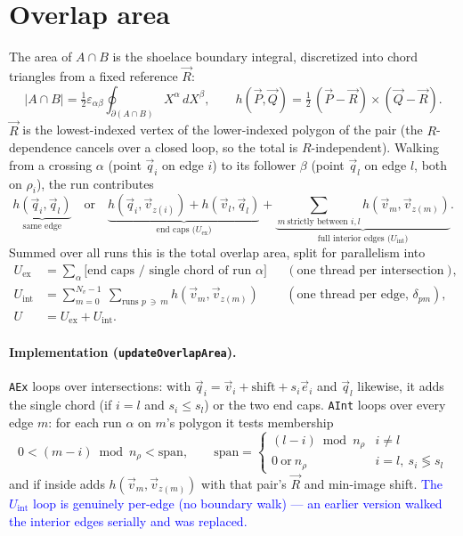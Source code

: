 \documentclass[11pt]{article}
\newcommand{\vv}[1]{\vec{#1}}
\newcommand{\eps}{\varepsilon}
\newcommand{\half}{\tfrac{1}{2}}
\newcommand{\cross}[2]{#1\!\times\!#2}
\newcommand{\code}[1]{\texttt{#1}}
\newcommand{\note}[1]{\textcolor{blue}{#1}}
\begin{document}
\section{Overlap area}

The area of $A\cap B$ is the shoelace boundary integral, discretized into chord triangles from a
fixed reference $\vv R$:
\begin{equation}
  |A\cap B|=\half\eps_{\alpha\beta}\oint_{\partial(A\cap B)}X^\alpha\,dX^\beta,\qquad
  h(\vv P,\vv Q)=\half\,\cross{(\vv P-\vv R)}{(\vv Q-\vv R)} .
\end{equation}
$\vv R$ is the lowest-indexed vertex of the lower-indexed polygon of the pair (the $R$-dependence
cancels over a closed loop, so the total is $R$-independent). Walking from a crossing $\alpha$ (point
$\vv q_i$ on edge $i$) to its follower $\beta$ (point $\vv q_l$ on edge $l$, both on $\rho_i$), the
run contributes
\begin{equation}
  \underbrace{h(\vv q_i,\vv q_l)}_{\text{same edge}}
  \quad\text{or}\quad
  \underbrace{h(\vv q_i,\vv v_{z(i)})+h(\vv v_l,\vv q_l)}_{\text{end caps (}U_{\text{ex}})}
  +\underbrace{\sum_{m\ \text{strictly between }i,l}h(\vv v_m,\vv v_{z(m)})}_{\text{full interior edges (}U_{\text{int}})}.
\end{equation}
Summed over all runs this is the total overlap area, split for parallelism into
\begin{align}
  U_{\text{ex}} &=\sum_{\alpha}\big[\text{end caps / single chord of run }\alpha\big]
    &&(\text{one thread per intersection}),\\
  U_{\text{int}}&=\sum_{m=0}^{N_v-1}\ \sum_{\text{runs }p\ \ni\ m}h(\vv v_m,\vv v_{z(m)})
    &&(\text{one thread per edge, }\delta_{pm}),\\
  U &=U_{\text{ex}}+U_{\text{int}}. &&
\end{align}

\paragraph{Implementation (\code{updateOverlapArea}).} \code{AEx} loops over intersections: with
$\vv q_i=\vv v_i+\text{shift}+s_i\vv e_i$ and $\vv q_l$ likewise, it adds the single chord (if
$i=l$ and $s_i\le s_l$) or the two end caps. \code{AInt} loops over every edge $m$: for each run
$\alpha$ on $m$'s polygon it tests membership
\[
  0<(m-i)\bmod n_{\rho}<\text{span},\qquad
  \text{span}=\begin{cases}(l-i)\bmod n_\rho & i\ne l\\ 0\ \text{or}\ n_\rho & i=l,\ s_i\lessgtr s_l\end{cases}
\]
and if inside adds $h(\vv v_m,\vv v_{z(m)})$ with that pair's $\vv R$ and min-image shift. \note{The
$U_{\text{int}}$ loop is genuinely per-edge (no boundary walk) --- an earlier version walked the
interior edges serially and was replaced.}
\end{document}
